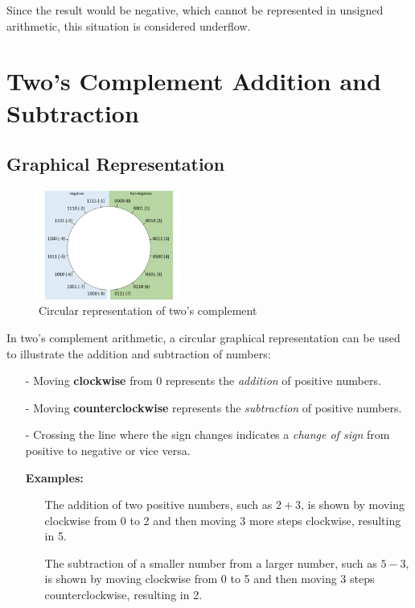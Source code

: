 \documentclass[12pt,openany]{book}
\begin{document}
		Since the result would be negative, which cannot be represented in unsigned arithmetic, this situation is considered underflow.
		
		
		\section{Two’s Complement
		Addition and Subtraction}
		\subsection*{Graphical Representation}
		
		\begin{figure} %
			\centering
			\includegraphics[width=0.41\textwidth]{circle-twoscomplement.png} %
			\caption*{Circular representation of two's complement}
		\end{figure}
		
		In two's complement arithmetic, a circular graphical representation can be used to illustrate the addition and subtraction of numbers:
		\begin{itemize}
			\item[-] Moving \textbf{clockwise} from 0 represents the \textit{addition} of positive numbers.
			\item[-] Moving \textbf{counterclockwise} represents the \textit{subtraction} of positive numbers.
			\item[-] Crossing the line where the sign changes indicates a \textit{change of sign} from positive to negative or vice versa.
			\item[] \textbf{Examples:}
			      \begin{itemize}
			      	\item[] The addition of two positive numbers, such as \(2 + 3\), is shown by moving clockwise from 0 to 2 and then moving 3 more steps clockwise, resulting in 5.
			      	\item[] The subtraction of a smaller number from a larger number, such as \(5 - 3\), is shown by moving clockwise from 0 to 5 and then moving 3 steps counterclockwise, resulting in 2.  
			      \end{itemize}
		\end{itemize}
		
\end{document}
